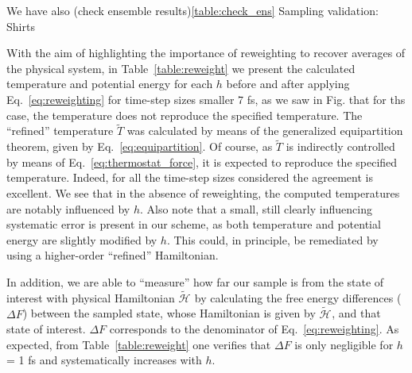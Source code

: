 \documentclass[
journal=jctcce,
layout=twocolumn
]{achemso}
\newcommand{\Ham}[1]{{\mathcal H}_\text{#1}}    %
\newcommand{\timestep}{h}
\newcommand{\modified}[1]{\widetilde{#1}}
\begin{document}
We have also (check ensemble results)\ref{table:check_ens} Sampling validation: Shirts \cite{Shirts_2013}

With the aim of highlighting the importance of reweighting to recover averages of the physical system, in Table~\ref{table:reweight} we present the calculated temperature and potential energy for each $\timestep$ before and after applying Eq.~\ref{eq:reweighting} for time-step sizes smaller 7 fs, as we saw in Fig. that for ths case, the temperature does not reproduce the specified temperature.
The ``refined'' temperature $\modified{T}$ was calculated by means of the generalized equipartition theorem, given by Eq.~\ref{eq:equipartition}.
Of course, as $\modified{T}$ is indirectly controlled by means of Eq.~\ref{eq:thermostat_force}, it is expected to reproduce the specified temperature.
Indeed, for all the time-step sizes considered the agreement is excellent.
We see that in the absence of reweighting, the computed temperatures are notably influenced by $h$.
Also note that a small, still clearly influencing systematic error is present in our scheme, as both temperature and potential energy are slightly modified by $h$. This could, in principle, be remediated by using a higher-order ``refined'' Hamiltonian.

In addition, we are able to ``measure'' how far our sample is from the state of interest with physical Hamiltonian $\modified{\Ham{}}$ by calculating the free energy differences ($\Delta F$) between the sampled state, whose Hamiltonian is given by $\modified{\Ham{}}$, and that state of interest.
$\Delta F$ corresponds to the denominator of Eq.~\ref{eq:reweighting}.
As expected, from Table~\ref{table:reweight} one verifies that $\Delta F$ is only negligible for $h$ = 1 fs and systematically increases with $h$.
\end{document}
